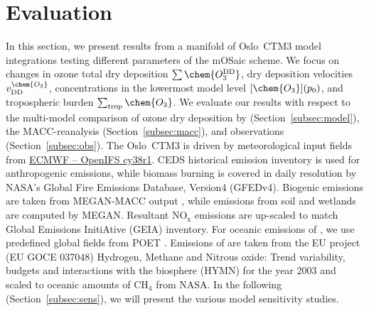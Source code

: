\documentclass[gmd, manuscript]{copernicus}
\begin{document}
\section{Evaluation}
\label{sec:eval}
In this section, we present results from a manifold of Oslo~CTM3 model integrations testing different parameters of the mOSaic scheme. We focus on changes in ozone total dry deposition $\sum\chem{O_3^\text{DD}}$, dry deposition velocities $v^\chem{O_3}_\text{DD}$, concentrations in the lowermost model level $[\chem{O_3}](p_0)$, and tropospheric burden $\sum_\text{trop}\chem{O_3}$. We evaluate our results with respect to the multi-model comparison of ozone dry deposition by \citet{ACP:Hardacre2015} (Section~\ref{subsec:model}), the MACC-reanalysis (Section~\ref{subsec:macc}), and observations (Section~\ref{subsec:obs}). The Oslo~CTM3 is driven by meteorological input fields from \href{https://www.ecmwf.int/en/forecasts/documentation-and-support/evolution-ifs/cycle-38r1-summary-changes}{ECMWF -- OpenIFS cy38r1}. CEDS historical emission inventory is used for anthropogenic emissions, while biomass burning is covered in daily resolution by NASA's Global Fire Emissions Database, Version4 (GFEDv4). Biogenic emissions are taken from MEGAN-MACC output \citep{ACP:Sindelarova2014}, while emissions from soil and wetlands are computed by MEGAN. Resultant $\mathrm{NO_x}$ emissions are up-scaled to match Global Emissions InitiAtive (GEIA) inventory. For oceanic emissions of , we use predefined global fields from POET \citep{POET}. Emissions of  are taken from the EU project (EU GOCE 037048) Hydrogen, Methane and Nitrous oxide: Trend variability, budgets and interactions with the biosphere (HYMN) for the year 2003 and scaled to oceanic amounts of $\mathrm{CH_4}$ from NASA. In the following (Section~\ref{subsec:sens}), we will present the various model sensitivity studies.
\end{document}
